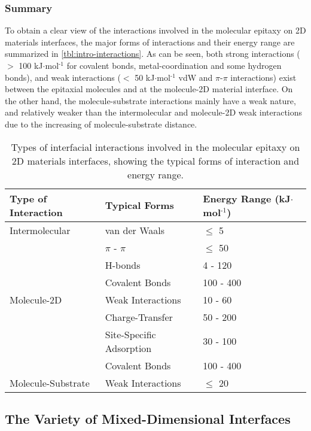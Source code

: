 \subsubsection{Summary}
\label{sec:org697d552}

To obtain a clear view of the interactions involved in the molecular
epitaxy on 2D materials interfaces, the major forms
of interactions and their energy range are summarized in
\autoref{tbl:intro-interactions}. As can be seen, both strong interactions ($>$ 100
kJ\(\cdot\)mol\(^{\text{-1}}\) for covalent bonds, metal-coordination and some
hydrogen bonds), and weak interactions ($<$ 50 kJ\(\cdot\)mol\(^{\text{-1}}\) vdW
and \(\pi\)-\(\pi\) interactions) exist between the epitaxial molecules and at
the molecule-2D material interface. On the other hand, the
molecule-substrate interactions mainly have a weak nature, and
relatively weaker than the intermolecular and molecule-2D weak
interactions due to the increasing of molecule-substrate distance.

\begin{table}[htbp]
  \centering
\caption{\label{tbl:intro-interactions}
Types of interfacial interactions involved in the molecular epitaxy on 2D materials interfaces, showing the typical forms of interaction and energy range.}
\centering
\begin{tabularx}{1.0\textwidth}{XXX}
\hline
Type of Interaction & Typical Forms & Energy Range  (kJ\(\cdot\)mol\(^{\text{-1}}\))\\
\hline
Intermolecular & van der Waals & \(\le\) 5\\
 & \(\pi\) - \(\pi\) & \(\le\) 50\\
 & H-bonds & 4 - 120 \cite{jeffrey_introduction_1997}\\
 & Covalent Bonds & 100 - 400\\
\hline
Molecule-2D & Weak Interactions & 10 - 60 \cite{Lazar_2013}\\
 & Charge-Transfer & 50 - 200\\
 & Site-Specific Adsorption & 30 - 100\\
 & Covalent Bonds & 100 - 400\\
\hline
Molecule-Substrate & Weak Interactions & \(\le\) 20\\
\hline
\end{tabularx}
\end{table}

\subsection{The Variety of Mixed-Dimensional Interfaces}
\label{sec:vari-mixed-dimens}

